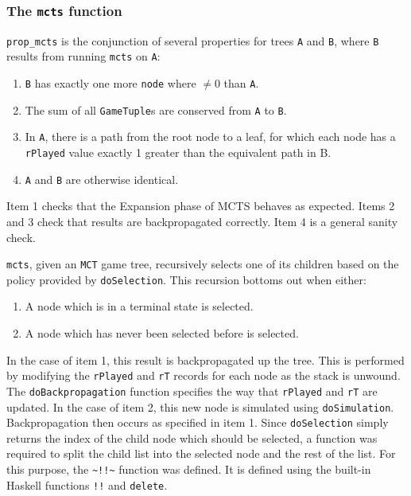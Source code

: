 \subsubsection{The \texttt{mcts} function}
\verb|prop_mcts| is the conjunction of several properties for trees \texttt{A} and \texttt{B}, where \texttt{B} results from running \texttt{mcts} on \texttt{A}:
\begin{enumerate}
\item \texttt{B} has exactly one more \texttt{node} where $\not=0$ than \texttt{A}.
\item The sum of all \texttt{GameTuple}s are conserved from \texttt{A} to \texttt{B}.
\item In \texttt{A}, there is a path from the root node to a leaf, for which each node has a \texttt{rPlayed} value exactly 1 greater than the equivalent path in {B}.
\item \texttt{A} and \texttt{B} are otherwise identical.
\end{enumerate}
Item 1 checks that the {Expansion} phase of {MCTS} behaves as expected. Items 2 and 3 check that results are {backpropagated} correctly. Item 4 is a general sanity check.

\texttt{mcts}, given an \texttt{MCT} game tree, recursively selects one of its children based on the policy provided by \texttt{doSelection}. This recursion bottoms out when either:
\begin{enumerate}
\item A node which is in a terminal state is selected.
\item A node which has never been selected before is selected.
\end{enumerate}
In the case of item 1, this result is {backpropagated} up the tree. This is performed by modifying the \texttt{rPlayed} and \texttt{rT} records for each node as the stack is unwound. The \texttt{doBackpropagation} function specifies the way that \texttt{rPlayed} and \texttt{rT} are updated. In the case of item 2, this new node is simulated using \texttt{doSimulation}. {Backpropagation} then occurs as specified in item 1.
Since \verb|doSelection| simply returns the index of the child node which should be selected, a function was required to split the child list into the selected node and the rest of the list. For this purpose, the \verb|~!!~| function was defined. It is defined using the built-in {Haskell} functions \verb|!!| and \verb|delete|.





